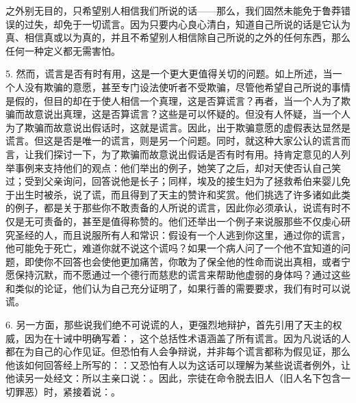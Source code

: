 之外别无目的，只希望别人相信我们所说的话——那么，我们固然未能免于鲁莽错误的过失，却免于一切谎言。因为只要内心良心清白，知道自己所说的话是它认为真、相信真或以为真的，并且不希望别人相信除自己所说的之外的任何东西，那么任何一种定义都无需害怕。\par

5. 然而，谎言是否有时有用，这是一个更大更值得关切的问题。如上所述，当一个人没有欺骗的意愿，甚至专门设法使听者不受欺骗，尽管他希望自己所说的事情是假的，但目的却在于使人相信一个真理，这是否算谎言？再者，当一个人为了欺骗而故意说出真理，这是否算谎言？这些是可以怀疑的。但没有人怀疑，当一个人为了欺骗而故意说出假话时，这就是谎言。因此，出于欺骗意愿的虚假表达显然是谎言。但这是否是唯一的谎言，则是另一个问题。同时，就这种大家公认的谎言而言，让我们探讨一下，为了欺骗而故意说出假话是否有时有用。持肯定意见的人列举事例来支持他们的观点：他们举出的例子，她笑了之后，却对天使否认自己笑过；受到父亲询问，回答说他是长子；同样，埃及的接生妇为了拯救希伯来婴儿免于出生时被杀，说了谎，而且得到了天主的赞许和奖赏。他们挑选了许多诸如此类的例子，都是关于那些你不敢责备的人所说的谎言，因此你必须承认，说谎有时不仅是无可责备的，甚至是值得称赞的。他们还举出一个例子来说服那些不仅虔心研究圣经的人，而且说服所有人和常识：假设有一个人逃到你这里，通过你的谎言，他可能免于死亡，难道你就不说这个谎吗？如果一个病人问了一个他不宜知道的问题，即使你不回答也会使他更加痛苦，你敢为了保全他的性命而说出真相，或者宁愿保持沉默，而不愿通过一个德行而慈悲的谎言来帮助他虚弱的身体吗？通过这些和类似的论证，他们认为自己充分证明了，如果行善的需要要求，我们有时可以说谎。\par

6. 另一方面，那些说我们绝不可说谎的人，更强烈地辩护，首先引用了天主的权威，因为在十诫中明确写着：，这个总括性术语涵盖了所有谎言。因为凡说话的人都在为自己的心作见证。但恐怕有人会争辩说，并非每个谎言都称为假见证，那么他该如何回答经上所写的：：又恐怕有人以为这话可以理解为某些说谎者例外，让他读另一处经文：所以主亲口说：。因此，宗徒在命令脱去旧人（旧人名下包含一切罪恶）时，紧接着说：。\par

